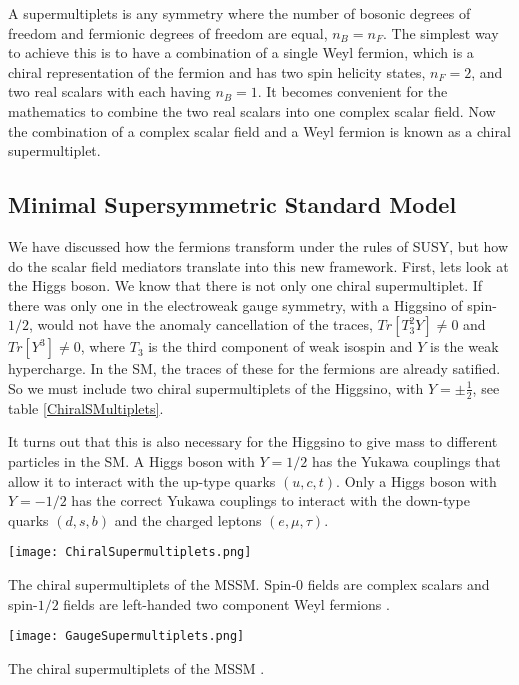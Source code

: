 A supermultiplets is any symmetry where the number of bosonic degrees of freedom and fermionic degrees of freedom are equal, $n_B=n_F$. The simplest  way to achieve this is to have a combination of a single Weyl fermion, which is a chiral representation of the fermion and has two spin helicity states, $n_F=2$, and two real scalars with each having $n_B=1$. It becomes convenient for the mathematics to combine the two real scalars into one complex scalar field. Now the combination of a complex scalar field and a Weyl fermion is known as a chiral supermultiplet. 

\subsection{Minimal Supersymmetric Standard Model}
\label{sec:MSSM}

We have discussed how the fermions transform under the rules of SUSY, but how do the scalar field mediators translate into this new framework. First, lets look at the Higgs boson. We know that there is not only one chiral supermultiplet. If there was only one in the electroweak gauge symmetry, with a Higgsino of spin-$1/2$, would not have the anomaly cancellation of the traces, $Tr[T^2_3Y]\neq0$ and $Tr[Y^3]\neq0$, where $T_3$ is the third component of weak isospin and $Y$ is the weak hypercharge. In the SM, the traces of these for the fermions are already satified. So we must include two chiral supermultiplets of the Higgsino, with $Y=\pm\frac{1}{2}$, see table \ref{ChiralSMultiplets}. 

It turns out that this is also necessary for the Higgsino to give mass to different particles in the SM. A Higgs boson with $Y=1/2$ has the Yukawa couplings that allow it to interact with the up-type quarks $(u, c, t)$. Only a Higgs boson with $Y=-1/2$ has the correct Yukawa couplings to interact with the down-type quarks $(d, s, b)$ and the charged leptons $(e, \mu, \tau)$.

\begin{table}
 	\centering
	\texttt{[image: ChiralSupermultiplets.png]}
 	\caption[Chiral supermultiplets for fermions and bosons]{The chiral supermultiplets of the MSSM. Spin-0 fields are complex scalars and spin-$1/2$ fields are left-handed two component Weyl fermions \cite{martin_supersymmetry_1997}.}
 	\label{ChiralSMultiplets} 
\end{table}

\begin{table}
 	\centering
	\texttt{[image: GaugeSupermultiplets.png]}
 	\caption[Chiral supermultiplets for gauge bosons]{The chiral supermultiplets of the MSSM \cite{martin_supersymmetry_1997}.}
 	\label{GaugeSMultiplets} 
\end{table}

